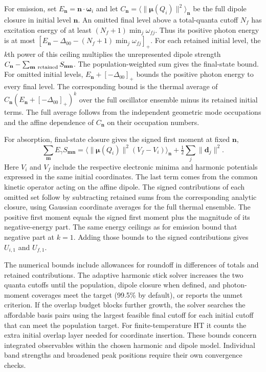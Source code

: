 For emission, set $E_{\mathbf n}=\mathbf n\cdot\boldsymbol\omega_i$ and
let $C_{\mathbf n}=\langle\|\boldsymbol\mu(Q_i)\|^2\rangle_{\mathbf n}$
be the full dipole closure in initial level $\mathbf n$. An omitted
final level above a total-quanta cutoff $N_f$ has excitation energy
of at least $(N_f+1)\min_j\omega_{fj}$. Thus its positive photon
energy is at most
$[E_{\mathbf n}-\Delta_{00}-(N_f+1)\min_j\omega_{fj}]_+$.
For each retained initial level, the $k$th power of this ceiling
multiplies the unrepresented dipole strength
$C_{\mathbf n}-\sum_{\mathbf m\ {\rm retained}}S_{\mathbf m\mathbf n}$.
The population-weighted sum gives the final-state bound. For omitted
initial levels, $E_{\mathbf n}+[-\Delta_{00}]_+$ bounds the positive
photon energy to every final level. The corresponding bound is the
thermal average of $C_{\mathbf n}(E_{\mathbf n}+[-\Delta_{00}]_+)^k$
over the full oscillator ensemble minus its retained initial terms.
The full average follows from the independent geometric mode
occupations and the affine dependence of $C_{\mathbf n}$ on their
occupation numbers.

For absorption, final-state closure gives the signed first moment
at fixed $\mathbf n$,
\begin{equation}
 \sum_{\mathbf m} E_\gamma S_{\mathbf m\mathbf n}
 = \bigl\langle\|\boldsymbol\mu(Q_i)\|^2 (V_f-V_i)\bigr\rangle_{\mathbf n}
   +\tfrac12\sum_j\|\mathbf d_j\|^2 .
 \label{eq:harmonic-signed-first-moment}
\end{equation}
Here $V_i$ and $V_f$ include the respective electronic minima and
harmonic potentials expressed in the same initial coordinates. The
last term comes from the common kinetic operator acting on the affine
dipole. The signed contributions of each omitted set follow by
subtracting retained sums from the corresponding analytic closure,
using Gaussian coordinate averages for the full thermal ensemble.
The positive first moment equals the signed first moment plus the
magnitude of its negative-energy part. The same energy ceilings as
for emission bound that negative part at $k=1$. Adding those bounds
to the signed contributions gives $U_{i,1}$ and $U_{f,1}$.

The numerical bounds include allowances for roundoff in differences
of totals and retained contributions. The adaptive harmonic stick
solver increases the two quanta cutoffs until the population, dipole
closure when defined, and photon-moment coverages meet the target
(99.5\% by default), or reports the unmet criterion. If the overlap
budget blocks further growth, the solver searches the affordable basis
pairs using the largest feasible final cutoff for each initial cutoff
that can meet the population target. For finite-temperature HT it counts
the extra initial overlap layer needed for coordinate insertion. These bounds
concern integrated observables within the chosen harmonic and dipole
model. Individual band strengths and broadened peak positions require
their own convergence checks.

